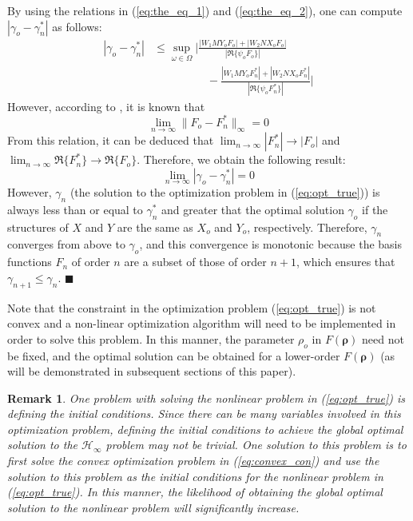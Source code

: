 \documentclass[letterpaper, 10 pt, conference]{ieeeconf}  %
\newtheorem*{remark*}{Remark}
\begin{document}
By using the relations in (\ref{eq:the_eq_1}) and (\ref{eq:the_eq_2}), one can compute $|\gamma_o - \gamma_n^*|$ as follows:
\begin{equation}
\begin{split}
|\gamma_o - \gamma_n^*|  & \leq \sup_{\omega \in \Omega} \bigg| \frac{|W_1MY_oF_o| + |W_2NX_oF_o|}{|\Re \{\psi_o F_o \}|}  \\  & \hspace{2cm}- \frac{|W_1MY_oF_n^*| + |W_2NX_oF_n^*|}{| \Re \{\psi_o F_n^* \}|} \bigg|
\end{split}
\end{equation}
However, according to \cite{AN99b}, it is known that
\begin{equation}
\lim_{n \to \infty} \|F_o - F_n^* \|_{\infty} = 0
\end{equation}
From this relation, it can be deduced that $\lim_{n \to \infty} |F_n^*| \rightarrow |F_o|$ and $\lim_{n \to \infty} \Re \{F_n^*\} \rightarrow \Re\{F_o\}$. Therefore, we obtain the following result:
\begin{equation}
\lim_{n \to \infty} |\gamma_o - \gamma_n^*|  = 0
\end{equation}
However, $\gamma_n$ (the solution to the optimization problem in (\ref{eq:opt_true})) is always less than or equal to $\gamma_n^*$ and greater that the optimal solution $\gamma_o$ if the structures of $X$ and $Y$ are the same as $X_o$ and $Y_o$, respectively. Therefore, $\gamma_n$ converges from above to $\gamma_o$, and this convergence is monotonic because the basis functions $F_n$ of order $n$ are a subset of those of order $n+1$, which ensures that $\gamma_{n+1} \leq \gamma_n$.
{\hfill \ensuremath{\blacksquare}}

Note that the constraint in the optimization problem (\ref{eq:opt_true}) is not convex and a non-linear optimization algorithm will need to be implemented in order to solve this problem. In this manner, the parameter $\rho_o$ in $F(\bm{\rho})$ need not be fixed, and the optimal solution can be obtained for a lower-order $F(\bm{\rho})$ (as will be demonstrated in subsequent sections of this paper).

\begin{remark*}
One problem with solving the nonlinear problem in (\ref{eq:opt_true}) is defining the initial conditions. Since there can be many variables involved in this optimization problem, defining the initial conditions to achieve the global optimal solution to the $\mathcal{H}_{\infty}$ problem may not be trivial. One solution to this problem is to first solve the convex optimization problem in (\ref{eq:convex_con}) and use the solution to this problem as the initial conditions for the nonlinear problem in (\ref{eq:opt_true}). In this manner, the likelihood of obtaining the global optimal solution to the nonlinear problem will significantly increase. 
\end{remark*}
\end{document}
